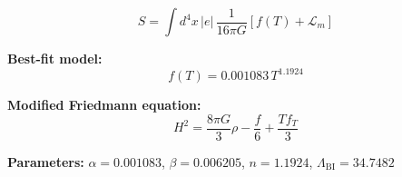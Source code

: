 
\begin{equation}
  S = \int d^4x \, |e| \, \frac{1}{16\pi G} \left[ f(T) + \mathcal{L}_m \right]
\end{equation}

\textbf{Best-fit model:}
\begin{equation}
  f(T) = 0.001083 \, T^{1.1924}
\end{equation}

\textbf{Modified Friedmann equation:}
\begin{equation}
  H^2 = \frac{8\pi G}{3} \rho - \frac{f}{6} + \frac{T f_T}{3}
\end{equation}

\textbf{Parameters:}
$\alpha = 0.001083$, \quad
$\beta = 0.006205$, \quad
$n = 1.1924$, \quad
$\Lambda_{\text{BI}} = 34.7482$